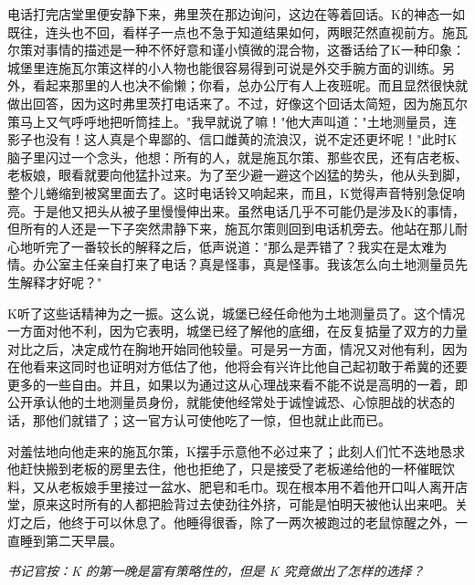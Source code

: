 \documentclass[12pt,a4paper]{article}
\newcommand{\clerknote}[1]{%
  \vspace{1.2em}%
  {\kaishu\small\textit{书记官按：#1}}%
}
\begin{document}
电话打完店堂里便安静下来，弗里茨在那边询问，这边在等着回话。K的神态一如既往，连头也不回，看样子一点也不急于知道结果如何，两眼茫然直视前方。施瓦尔策对事情的描述是一种不怀好意和谨小慎微的混合物，这番话给了K一种印象：城堡里连施瓦尔策这样的小人物也能很容易得到可说是外交手腕方面的训练。另外，看起来那里的人也决不偷懒；你看，总办公厅有人上夜班呢。而且显然很快就做出回答，因为这时弗里茨打电话来了。不过，好像这个回话太简短，因为施瓦尔策马上又气呼呼地把听筒挂上。"我早就说了嘛！"他大声叫道："土地测量员，连影子也没有！这人真是个卑鄙的、信口雌黄的流浪汉，说不定还更坏呢！"此时K脑子里闪过一个念头，他想：所有的人，就是施瓦尔策、那些农民，还有店老板、老板娘，眼看就要向他猛扑过来。为了至少避一避这个凶猛的势头，他从头到脚，整个儿蜷缩到被窝里面去了。这时电话铃又响起来，而且，K觉得声音特别急促响亮。于是他又把头从被子里慢慢伸出来。虽然电话几乎不可能仍是涉及K的事情，但所有的人还是一下子突然肃静下来，施瓦尔策则回到电话机旁去。他站在那儿耐心地听完了一番较长的解释之后，低声说道："那么是弄错了？我实在是太难为情。办公室主任亲自打来了电话？真是怪事，真是怪事。我该怎么向土地测量员先生解释才好呢？"

K听了这些话精神为之一振。这么说，城堡已经任命他为土地测量员了。这个情况一方面对他不利，因为它表明，城堡已经了解他的底细，在反复掂量了双方的力量对比之后，决定成竹在胸地开始同他较量。可是另一方面，情况又对他有利，因为在他看来这同时也证明对方低估了他，他将会有兴许比他自己起初敢于希冀的还要更多的一些自由。并且，如果以为通过这从心理战来看不能不说是高明的一着，即公开承认他的土地测量员身份，就能使他经常处于诚惶诚恐、心惊胆战的状态的话，那他们就错了；这一官方认可使他吃了一惊，但也就止此而已。

对羞怯地向他走来的施瓦尔策，K摆手示意他不必过来了；此刻人们忙不迭地恳求他赶快搬到老板的房里去住，他也拒绝了，只是接受了老板递给他的一杯催眠饮料，又从老板娘手里接过一盆水、肥皂和毛巾。现在根本用不着他开口叫人离开店堂，原来这时所有的人都把脸背过去使劲往外挤，可能是怕明天被他认出来吧。关灯之后，他终于可以休息了。他睡得很香，除了一两次被跑过的老鼠惊醒之外，一直睡到第二天早晨。

\clerknote{K 的第一晚是富有策略性的，但是 K 究竟做出了怎样的选择？}
\end{document}

